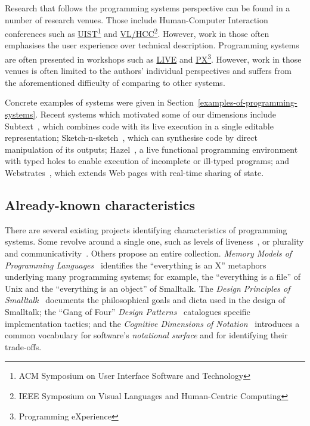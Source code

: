 \documentclass[ twoside,openright,titlepage,numbers=noenddot,headinclude,footinclude,cleardoublepage=empty,abstract=on,
                BCOR=5mm,paper=a4,fontsize=11pt
                ]{scrreprt}
\theoremstyle{definition}
\begin{document}
Research that follows the programming systems perspective can be found
in a number of research venues. Those include Human-Computer Interaction
conferences such as \href{https://uist.acm.org/}{UIST}\footnote{ACM
  Symposium on User Interface Software and Technology} and
\href{https://conferences.computer.org/VLHCC/}{VL/HCC}\footnote{IEEE
  Symposium on Visual Languages and Human-Centric Computing}. However,
work in those often emphasises the user experience over technical
description. Programming systems are often presented in workshops such
as \href{https://liveprog.org/}{LIVE} and
\href{https://2021.programming-conference.org/home/px-2021}{PX}\footnote{Programming
  eXperience}. However, work in those venues is often limited to the
authors' individual perspectives and suffers from the aforementioned
difficulty of comparing to other systems.

Concrete examples of systems were given in
Section~\ref{examples-of-programming-systems}. Recent systems which
motivated some of our dimensions include Subtext~\parencite{Subtext},
which combines code with its live execution in a single editable
representation; Sketch-n-sketch~\parencite{SnS}, which can synthesise
code by direct manipulation of its outputs; Hazel~\parencite{Hazel}, a
live functional programming environment with typed holes to enable
execution of incomplete or ill-typed programs; and
Webstrates~\parencite{Webstrates}, which extends Web pages with
real-time sharing of state.

\hypertarget{already-known-characteristics}{\subsection{Already-known
characteristics}\label{already-known-characteristics}}

There are several existing projects identifying characteristics of
programming systems. Some revolve around a single one, such as levels of
liveness~\parencite{Liveness}, or plurality and
communicativity~\parencite{Kell-C}. Others propose an entire collection.
\emph{Memory Models of Programming Languages}~\parencite{Mem-mods}
identifies the ``everything is an X'' metaphors underlying many
programming systems; for example, the ``everything is a file'' of Unix
and the ``everything is an object'' of Smalltalk. The \emph{Design
Principles of Smalltalk}~\parencite{STdesign} documents the
philosophical goals and dicta used in the design of Smalltalk; the
``Gang of Four'' \emph{Design Patterns}~\parencite{DesPats} catalogues
specific implementation tactics; and the \emph{Cognitive Dimensions of
Notation}~\parencite{CogDims} introduces a common vocabulary for
software's \emph{notational surface} and for identifying their
trade-offs.
\end{document}
